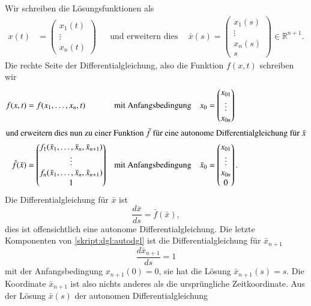 Wir schreiben die Lösungsfunktionen als
\begin{align*}
x(t)
&=
\begin{pmatrix}
x_1(t) \\ \vdots \\x_n(t)
\end{pmatrix}
&&\text{und erweitern dies zu}&
\bar x(s)
=
\begin{pmatrix}
x_1(s) \\ \vdots \\ x_n(s) \\ s
\end{pmatrix}
\in\mathbb R^{n+1}.
\end{align*}
Die rechte Seite der Differentialgleichung, also die Funktion $f(x,t)$
schreiben wir
\begin{align*}
f(x,t)
&=
f(x_1,\dots,x_n,t)
&&\text{mit Anfangsbedingung}&
x_0
&=
\begin{pmatrix} x_{01} \\ \vdots \\ x_{0n} \end{pmatrix}
\\
\intertext{und erweitern dies nun zu einer Funktion $\bar f$ für eine
autonome Differentialgleichung für $\bar x$}
\bar f(\bar x)
&=
\begin{pmatrix}
f_1(\bar x_1,\dots,\bar x_n,\bar x_{n+1})\\
\vdots\\
f_n(\bar x_1,\dots,\bar x_n,\bar x_{n+1})\\
1
\end{pmatrix}
&&\text{mit Anfangsbedingung}&
\bar x_0
&=
\begin{pmatrix} x_{01} \\ \vdots \\ x_{0n} \\ 0\end{pmatrix}.
\end{align*}
Die Differentialgleichung für $\bar x$ ist
\begin{equation}
\frac{d\bar x}{ds}
=
\bar f(\bar x),
\label{skript:dgl:autodgl}
\end{equation}
dies ist offensichtlich eine autonome Differentialgleichung.
Die letzte Komponenten von \eqref{skript:dgl:autodgl} ist die
Differentialgleichung für $\bar x_{n+1}$
\[
\frac{d\bar x_{n+1}}{ds} = 1
\]
mit der Anfangsbedingung $x_{n+1}(0)=0$, sie hat die Lösung
$\bar x_{n+1}(s)=s$.
Die Koordinate $\bar x_{n+1}$ ist also nichts anderes als die
ursprüngliche Zeitkoordinate.
Aus der Lösung $\bar x(s)$ der autonomen Differentialgleichung
